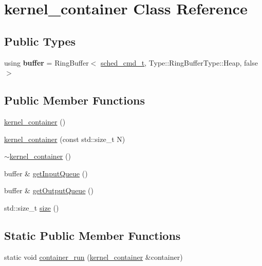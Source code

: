 \hypertarget{classkernel__container}{}\section{kernel\+\_\+container Class Reference}
\label{classkernel__container}
\subsection*{Public Types}
\begin{DoxyCompactItemize}
\item 
\hypertarget{classkernel__container_aaa8403088c93fca461e37158069d91b5}{}\label{classkernel__container_aaa8403088c93fca461e37158069d91b5} 
using {\bfseries buffer} = Ring\+Buffer$<$ \hyperlink{structsched__cmd__t}{sched\+\_\+cmd\+\_\+t}, Type\+::\+Ring\+Buffer\+Type\+::\+Heap, false $>$
\end{DoxyCompactItemize}
\subsection*{Public Member Functions}
\begin{DoxyCompactItemize}
\item 
\hyperlink{classkernel__container_a273d59eff9b9e269f1f9b231abc37b83}{kernel\+\_\+container} ()
\item 
\hyperlink{classkernel__container_a6d97cddd3d2f015166485afad9c71ff5}{kernel\+\_\+container} (const std\+::size\+\_\+t N)
\item 
\hyperlink{classkernel__container_acec164e3f4c6f37f4791c90c24514b34}{$\sim$kernel\+\_\+container} ()
\item 
buffer \& \hyperlink{classkernel__container_abcbec3854917b37bd6421b6b8ed2c2c0}{get\+Input\+Queue} ()
\item 
buffer \& \hyperlink{classkernel__container_a64384e258fee9b664d164eb50baf33df}{get\+Output\+Queue} ()
\item 
std\+::size\+\_\+t \hyperlink{classkernel__container_a358a15b772f1b7dfa57bd733fc78fcaa}{size} ()
\end{DoxyCompactItemize}
\subsection*{Static Public Member Functions}
\begin{DoxyCompactItemize}
\item 
static void \hyperlink{classkernel__container_a89f9b11119d9ab0e8c64215bf50856f0}{container\+\_\+run} (\hyperlink{classkernel__container}{kernel\+\_\+container} \&container)
\end{DoxyCompactItemize}


